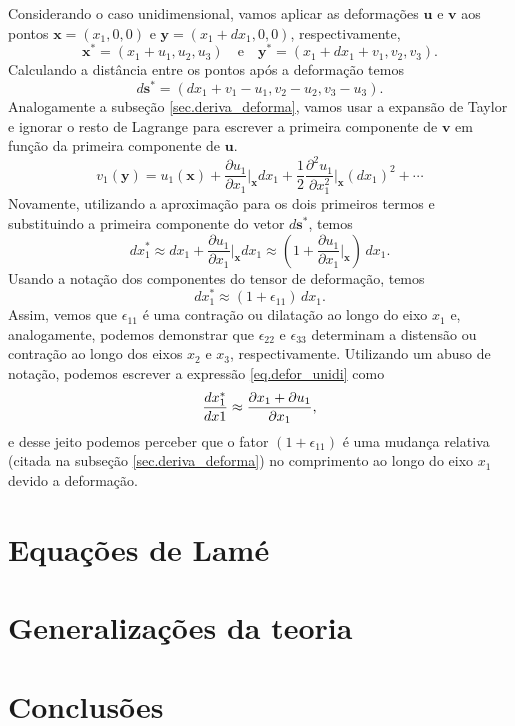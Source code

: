 Considerando o caso unidimensional, vamos aplicar as deforma\c{c}\~oes $\mathbf{u}$ e $\mathbf{v}$ aos pontos $\mathbf{x}=(x_1,0,0)$ e $\mathbf{y}=(x_1+dx_1,0,0)$, respectivamente,
\begin{equation*}
\mathbf{x}^*=(x_1+u_1,u_2,u_3)\quad\text{e}\quad\mathbf{y}^*=(x_1+dx_1+v_1,v_2,v_3).
\end{equation*}
Calculando a dist\^ancia entre os pontos ap\'os a deforma\c{c}\~ao temos
\begin{equation*}
d\mathbf{s}^*=(dx_1+v_1-u_1,v_2-u_2,v_3-u_3).
\end{equation*}
Analogamente a subse\c{c}\~ao \ref{sec.deriva_deforma}, vamos usar a expans\~ao de Taylor e ignorar o resto de Lagrange para escrever a primeira componente de $\mathbf{v}$ em fun\c{c}\~ao da primeira componente de $\mathbf{u}$. 
\begin{equation*}
v_1(\mathbf{y})=u_1(\mathbf{x})+\frac{\partial u_1}{\partial x_1}\Bigg\vert_{\mathbf{x}}dx_1+\frac{1}{2}\frac{\partial^2 u_1}{\partial x_1^2}\Bigg\vert_{\mathbf{x}}(dx_1)^2+\cdots
\end{equation*}
Novamente, utilizando a aproxima\c{c}\~ao para os dois primeiros termos e substituindo a primeira componente do vetor $d\mathbf{s}^*$, temos
\begin{equation}
dx_1^*\approx dx_1+\frac{\partial u_1}{\partial x_1}\Bigg\vert_{\mathbf{x}}dx_1\approx \left(1+\frac{\partial u_1}{\partial x_1}\Bigg\vert_{\mathbf{x}}\right)\,dx_1. 
\end{equation}
Usando a nota\c{c}\~ao dos componentes do tensor de deforma\c{c}\~ao, temos
\begin{equation}\label{eq.defor_unidi}
dx_1^*\approx(1+\epsilon_{11})\,dx_1.
\end{equation} 
Assim, vemos que $\epsilon_{11}$ \'e uma contra\c{c}\~ao ou dilata\c{c}\~ao ao longo do eixo $x_1$ e, analogamente, podemos demonstrar que $\epsilon_{22}$ e $\epsilon_{33}$ determinam a distens\~ao ou contra\c{c}\~ao ao longo dos eixos $x_2$ e $x_3$, respectivamente.
Utilizando um abuso de nota\c{c}\~ao, podemos escrever a express\~ao \ref{eq.defor_unidi} como
\begin{equation*}
\frac{dx_1^*}{dx\-1}\approx \frac{\partial x_1+\partial u_1}{\partial x_1},
\end{equation*}
e desse jeito podemos perceber que o fator $(1+\epsilon_{11})$ \'e uma mudan\c{c}a relativa (citada na subse\c{c}\~ao \ref{sec.deriva_deforma}) no comprimento ao longo do eixo $x_1$ devido a deforma\c{c}\~ao.




\section{Equações de Lamé}

\section{Generalizações da teoria}

\section{Conclusões}